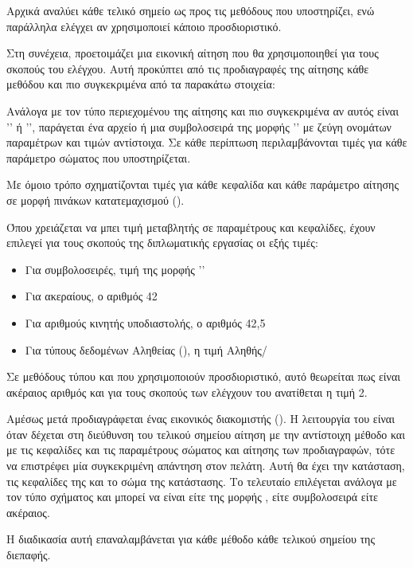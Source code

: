 Αρχικά αναλύει κάθε τελικό σημείο ως προς τις μεθόδους που υποστηρίζει,
ενώ παράλληλα ελέγχει αν χρησιμοποιεί κάποιο προσδιοριστικό.

Στη συνέχεια, προετοιμάζει μια εικονική αίτηση που θα χρησιμοποιηθεί για τους σκοπούς του ελέγχου.
Αυτή προκύπτει από τις προδιαγραφές της αίτησης κάθε μεθόδου και πιο συγκεκριμένα από τα παρακάτω στοιχεία:

Ανάλογα με τον τύπο περιεχομένου της αίτησης και πιο συγκεκριμένα αν αυτός είναι '' ή '',
παράγεται ένα αρχείο  ή μια συμβολοσειρά της μορφής '' με ζεύγη ονομάτων παραμέτρων και τιμών αντίστοιχα.
Σε κάθε περίπτωση περιλαμβάνονται τιμές για κάθε παράμετρο σώματος που υποστηρίζεται.

Με όμοιο τρόπο σχηματίζονται τιμές για κάθε κεφαλίδα και κάθε παράμετρο αίτησης σε μορφή πινάκων κατατεμαχισμού ().

Όπου χρειάζεται να μπει τιμή μεταβλητής σε παραμέτρους και κεφαλίδες,
έχουν επιλεγεί για τους σκοπούς της διπλωματικής εργασίας οι εξής τιμές:

\begin{itemize}
    \item Για συμβολοσειρές, τιμή της μορφής ''
    \item Για ακεραίους, ο αριθμός 42
    \item Για αριθμούς κινητής υποδιαστολής, ο αριθμός 42,5
    \item Για τύπους δεδομένων Αληθείας (), η τιμή Αληθής/
\end{itemize}

Σε μεθόδους τύπου  και  που χρησιμοποιούν προσδιοριστικό,
αυτό θεωρείται πως είναι ακέραιος αριθμός και για τους σκοπούς των ελέγχουν του ανατίθεται η τιμή 2.

Αμέσως μετά προδιαγράφεται ένας εικονικός διακομιστής ().
Η λειτουργία του είναι όταν δέχεται στη διεύθυνση του τελικού σημείου
αίτηση με την αντίστοιχη μέθοδο και με τις κεφαλίδες και τις παραμέτρους σώματος και αίτησης των προδιαγραφών,
τότε να επιστρέφει μία συγκεκριμένη απάντηση στον πελάτη.
Αυτή θα έχει την κατάσταση,
τις κεφαλίδες της
και το σώμα της κατάστασης.
Το τελευταίο επιλέγεται ανάλογα με τον τύπο σχήματος και μπορεί να είναι είτε της μορφής ,
είτε συμβολοσειρά είτε ακέραιος.

Η διαδικασία αυτή επαναλαμβάνεται για κάθε μέθοδο κάθε τελικού σημείου της διεπαφής.

